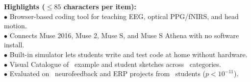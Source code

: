 \documentclass[11pt]{article}
\begin{document}
\begin{abstract}
\noindent\textbf{Comparison with Existing Methods:} Unlike desktop \texttt{LabStreamingLayer}/Python setups or legacy browser libraries that fail on newer Muse~2, Muse~S, and Muse~S Athena headsets, BrainImation runs in a standard browser with zero installation.\\
\noindent\textbf{Conclusions:} BrainImation provides an accessible classroom platform for teaching multimodal neuroscience and physiological signal processing.\\[3pt]
\noindent\textbf{Keywords:} neuroscience education; electroencephalography (EEG); functional near-infrared spectroscopy (fNIRS); photoplethysmography (PPG); brain--computer interface (BCI); event-related potential (ERP)
\end{abstract}

\vspace{2pt}
\noindent\colorbox{codebg}{\parbox{0.98\textwidth}{\footnotesize\textbf{Highlights ($\le 85$ characters per item):}\\
$\bullet$ Browser-based coding tool for teaching EEG, optical PPG/fNIRS, and head motion.\\
$\bullet$ Connects Muse 2016, Muse 2, Muse S, and Muse S Athena with no software install.\\
$\bullet$ Built-in simulator lets students write and test code at home without hardware.\\
$\bullet$ Visual Catalogue of \NCatalogueSketches\ example and student sketches across \NCatalogueCategories\ categories.\\
$\bullet$ Evaluated on \NStudentSketches\ neurofeedback and ERP projects from \NUniqueStudents\ students ($p < 10^{-11}$).}}
\vspace{4pt}
\end{document}
